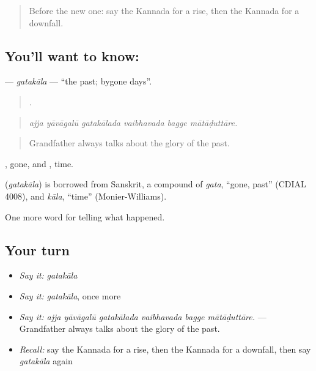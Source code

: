 \label{lesson:KA-C373-gatakala}



\begin{quote}
Before the new one: say the Kannada for a rise, then the Kannada for a downfall.
\end{quote}

\subsection*{You'll want to know: }
\textbf{} — \emph{gatakāla} — \textquotedblleft{}the past; bygone days\textquotedblright{}.

\begin{quote}
     .
\end{quote}

\begin{quote}
\emph{ajja yāvāgalū gatakālada vaibhavada bagge mātāḍuttāre.}
\end{quote}

\begin{quote}
Grandfather always talks about the glory of the past.
\end{quote}

, gone, and , time.

\begin{cousinweb}
\textbf{} (\emph{gatakāla}) is borrowed from Sanskrit, a compound of \emph{gata}, \textquotedblleft{}gone, past\textquotedblright{} (CDIAL 4008), and \emph{kāla}, \textquotedblleft{}time\textquotedblright{} (Monier-Williams).
\end{cousinweb}

\begin{grammarlens}[title={What you've built}]
One more word for telling what happened.
\end{grammarlens}

\subsection*{Your turn}
\begin{itemize}
\raggedright
  \item \emph{Say it:} \emph{gatakāla}
  \item \emph{Say it:} \emph{gatakāla}, once more
  \item \emph{Say it:} \emph{ajja yāvāgalū gatakālada vaibhavada bagge mātāḍuttāre.} — Grandfather always talks about the glory of the past.
  \item \emph{Recall:} say the Kannada for a rise, then the Kannada for a downfall, then say \emph{gatakāla} again
\end{itemize}

